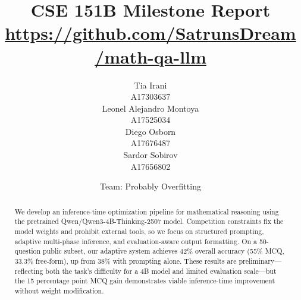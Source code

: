 \documentclass{article}
\title{
CSE 151B Milestone Report
\\
{\small \url{https://github.com/SatrunsDream/math-qa-llm}} %
}
\author{
Tia Irani\\
A17303637\\
\And
Leonel Alejandro Montoya\\
A17525034 \\
\And
Diego Osborn \\
A17676487 \\
\And
Sardor Sobirov\\
A17656802\\
\and
Team: Probably Overfitting
}
\begin{document}
\maketitle
\begin{abstract}
We develop an inference-time optimization pipeline for mathematical reasoning using the pretrained Qwen/Qwen3-4B-Thinking-2507 model. Competition constraints fix the model weights and prohibit external tools, so we focus on structured prompting, adaptive multi-phase inference, and evaluation-aware output formatting. On a 50-question public subset, our adaptive system achieves 42\% overall accuracy (55\% MCQ, 33.3\% free-form), up from 38\% with prompting alone. These results are preliminary---reflecting both the task's difficulty for a 4B model and limited evaluation scale---but the 15 percentage point MCQ gain demonstrates viable inference-time improvement without weight modification.
\end{abstract}

\end{document}
